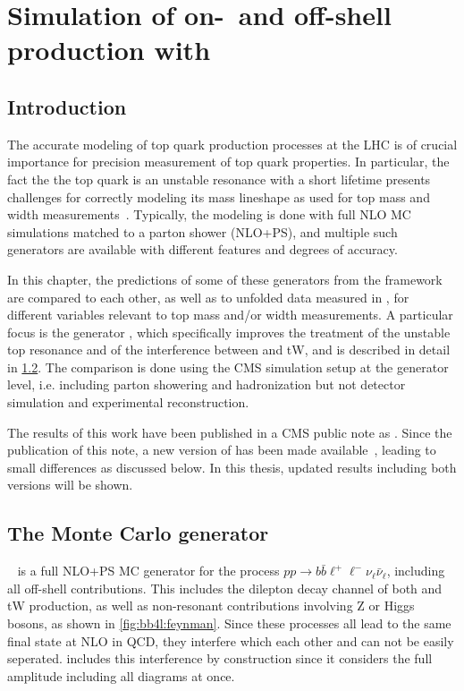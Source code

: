 \chapter{Simulation of on-~and off-shell \ttbartitle production with \texorpdfstring{\bbfourl}{bb4l}}
\label{ch:bb4l}

\section{Introduction}

The accurate modeling of top quark production processes at the LHC is of crucial importance for precision measurement of top quark properties. In particular, the fact the the top quark is an unstable resonance with a short lifetime presents challenges for correctly modeling its mass lineshape as used for top mass and width measurements~\cite{Tarrach:1980up,Smith:1996xz,Hoang:2020iah}. Typically, the modeling is done with full NLO MC simulations matched to a parton shower (NLO+PS), and multiple such generators are available with different features and degrees of accuracy.

In this chapter, the predictions of some of these generators from the \powheg framework~\cite{Powheg:2004,Powheg:2007} are compared to each other, as well as to unfolded data measured in , for different variables relevant to top mass and/or width measurements. A particular focus is the generator \bbfourl \cite{Jezo:2016ujg}, which specifically improves the treatment of the unstable top resonance and of the interference between \ttbar and tW, and is described in detail in \cref{sec:bb4l:bb4l}. The comparison is done using the CMS simulation setup at the generator level, i.e. including parton showering and hadronization but not detector simulation and experimental reconstruction.

The results of this work have been published in a CMS public note as . Since the publication of this note, a new version of \bbfourl has been made available~\cite{Jezo:2023rht}, leading to small differences as discussed below. In this thesis, updated results including both versions will be shown.

\section{The Monte Carlo generator \texorpdfstring{\bbfourl}{bb4l}}
\label{sec:bb4l:bb4l}

\bbfourl ~\cite{Jezo:2016ujg,Jezo:2023rht} is a full NLO+PS MC generator for the process $pp \to b \bar{b} \ell^+ \ell^- \nu_\ell \bar{\nu}_\ell$, including all off-shell contributions. This includes the dilepton decay channel of both \ttbar and tW production, as well as non-resonant contributions involving Z or Higgs bosons, as shown in \cref{fig:bb4l:feynman}. Since these processes all lead to the same final state at NLO in QCD, they interfere which each other and can not be easily seperated. \bbfourl includes this interference by construction since it considers the full amplitude including all diagrams at once.

